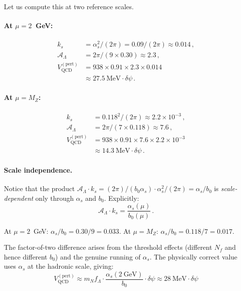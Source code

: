 \documentclass[aps,prd,twocolumn,superscriptaddress,floatfix,nofootinbib]{revtex4-2}
\newcommand{\as}{\alpha_s}
\newcommand{\mN}{m_N}
\newcommand{\ks}{k_s}
\newcommand{\dpsi}{\delta\psi}
\begin{document}
Let us compute this at two reference scales.

\paragraph{At $\mu = 2$~GeV:}
\begin{align}
\ks &= \as^2/(2\pi) = 0.09/(2\pi) \approx 0.014 \, , \\
\mathcal{A}_\Lambda &= 2\pi/(9 \times 0.30) \approx 2.3 \, , \\
V_{\mathrm{QCD}}^{(\mathrm{pert})}
&= 938 \times 0.91 \times 2.3 \times 0.014 \nonumber \\
&\approx 27.5~\text{MeV} \cdot \dpsi \, .
\label{eq:V_QCD_2GeV}
\end{align}

\paragraph{At $\mu = M_Z$:}
\begin{align}
\ks &= 0.118^2/(2\pi) \approx 2.2 \times 10^{-3} \, , \\
\mathcal{A}_\Lambda &= 2\pi/(7 \times 0.118) \approx 7.6 \, , \\
V_{\mathrm{QCD}}^{(\mathrm{pert})}
&= 938 \times 0.91 \times 7.6 \times 2.2 \times 10^{-3} \nonumber \\
&\approx 14.3~\text{MeV} \cdot \dpsi \, .
\label{eq:V_QCD_MZ}
\end{align}

\paragraph{Scale independence.}
Notice that the product $\mathcal{A}_\Lambda \cdot \ks = (2\pi)/(b_0 \as)
\cdot \as^2/(2\pi) = \as/b_0$ is \emph{scale-dependent} only through $\as$
and $b_0$. Explicitly:
\begin{equation}
\mathcal{A}_\Lambda \cdot \ks = \frac{\as(\mu)}{b_0(\mu)} \, .
\label{eq:product_scale}
\end{equation}

At $\mu = 2$~GeV: $\as/b_0 = 0.30/9 = 0.033$.
At $\mu = M_Z$: $\as/b_0 = 0.118/7 = 0.017$.

The factor-of-two difference arises from the threshold effects (different
$N_f$ and hence different $b_0$) and the genuine running of $\as$. The
physically correct value uses $\as$ at the hadronic scale, giving:
\begin{equation}
\boxed{
V_{\mathrm{QCD}}^{(\mathrm{pert})} \approx
\mN f_\Lambda \cdot \frac{\as(2~\text{GeV})}{b_0} \cdot \dpsi
\approx 28~\text{MeV} \cdot \dpsi
}
\label{eq:V_QCD_final}
\end{equation}
\end{document}
